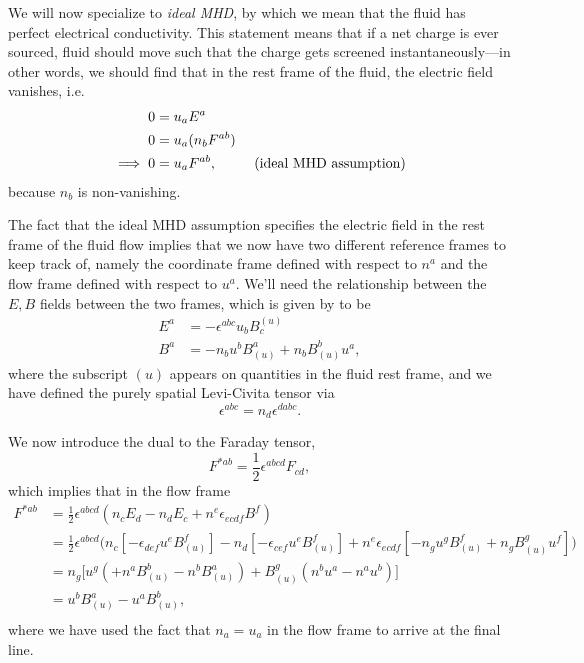 \documentclass[12pt]{article}
\numberwithin{equation}{section}
\begin{document}
We will now specialize to \textit{ideal MHD}, by which we mean that the fluid has perfect electrical conductivity.
This statement means that if a net charge is ever sourced, fluid should move such that the charge gets screened instantaneously---in other words, we should find that in the rest frame of the fluid, the electric field vanishes, i.e. 
\begin{equation}
\begin{aligned}
0 &= u_a E^{a} \\
0 &= u_a (n_b F^{ab}) \\
\implies 0 &= u_{a} F^{ab}, ~~~~~~~~\textnormal{(ideal MHD assumption)}
\end{aligned}
\end{equation}
because $n_b$ is non-vanishing.

The fact that the ideal MHD assumption specifies the electric field in the rest frame of the fluid flow implies that we now have two different reference frames to keep track of, namely the coordinate frame defined with respect to $n^a$ and the flow frame defined with respect to $u^a$.
We'll need the relationship between the $E, B$ fields between the two frames, which is given by \cite{BaumgarteShapiro} to be
\begin{align}
E^{a} &= -\epsilon^{abc} u_b B^{(u)}_{c} \\
B^{a} &= -n_b u^b B^{a}_{(u)} + n_b B^{b}_{(u)} u^a,
\end{align}
where the subscript $(u)$ appears on quantities in the fluid rest frame, and we have defined the purely spatial Levi-Civita tensor via
\begin{equation}
\epsilon^{abc} = n_d \epsilon^{dabc}.
\end{equation}

We now introduce the dual to the Faraday tensor,
\begin{equation}
F^{*ab} = \frac{1}{2} \epsilon^{abcd} F_{cd},
\end{equation}
which implies that in the flow frame
\begin{equation} \label{eq:Fstar_Bflow}
\begin{aligned}
F^{*ab} &= \frac{1}{2} \epsilon^{abcd} (n_c E_d - n_d E_c + n^e \epsilon_{ecdf} B^f) \\
&= \frac{1}{2} \epsilon^{abcd} \Big( n_c [-\epsilon_{def} u^e B_{(u)}^{f}] - n_d [-\epsilon_{cef} u^e B_{(u)}^{f}] + n^e \epsilon_{ecdf} [-n_g u^g B^{f}_{(u)} + n_g B^{g}_{(u)} u^f] \Big) \\
&= n_g \Big[ u^g (+ n^a B^{b}_{(u)} - n^b B^{a}_{(u)}) + B^{g}_{(u)} (n^b u^a - n^a u^b) \Big] \\
&= u^b B^{a}_{(u)} - u^a B^{b}_{(u)}, \\
\end{aligned}
\end{equation}
where we have used the fact that $n_a = u_a$ in the flow frame to arrive at the final line.
\end{document}
